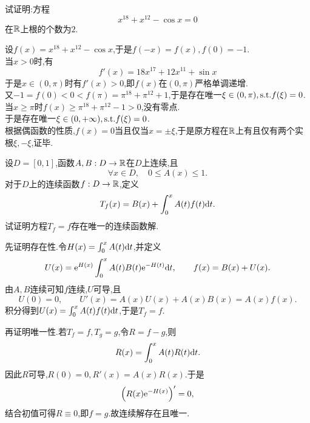 \documentclass{ctexart}
\begin{document}
\begin{problem}[7.(15\songti{分})]
    试证明:方程$$x^{18}+x^{12}-\cos x=0$$在$\mathbb{R}$上根的个数为$2$.
\end{problem}
\begin{solution}
    设$f(x)=x^{18}+x^{12}-\cos x$,于是$f(-x)=f(x),f(0)=-1$.\\
    当$x>0$时,有$$f'(x)=18x^{17}+12x^{11}+\sin x$$
    于是$x\in(0,\pi)$时有$f'(x)>0$,即$f(x)$在$(0,\pi)$严格单调递增.\\
    又$-1=f(0)<0<f(\pi)=\pi^{18}+\pi^{12}+1$,于是存在唯一$\xi\in(0,\pi),\text{s.t.} f(\xi)=0$.\\
    当$x\geqslant\pi$时$f(x)\geqslant \pi^{18}+\pi^{12}-1>0$,没有零点.\\
    于是存在唯一$\xi\in(0,+\infty),\text{s.t.} f(\xi)=0$.\\
    根据偶函数的性质,$f(x)=0$当且仅当$x=\pm\xi$,于是原方程在$\mathbb{R}$上有且仅有两个实根$\xi,-\xi$,证毕.
\end{solution}
\begin{problem}[8.(15\songti{分})]
设$D=[0,1]$,函数$A,B:D\to\mathbb{R}$在$D$上连续,且
    \[\forall x\in D,\quad0\leqslant A(x)\leqslant1.\]
    对于$D$上的连续函数$f:D\to\mathbb{R}$,定义
    \[T_f(x)=B(x)+\int_0^xA(t)f(t)\mathrm{d} t.\]
    试证明方程$T_f=f$存在唯一的连续函数解.
\end{problem}
\begin{solution}
先证明存在性.令$H(x)=\int_0^xA(t)\mathrm{d} t$,并定义
    \[U(x)=\mathrm{e}^{H(x)}\int_0^xA(t)B(t)\mathrm{e}^{-H(t)}\mathrm{d} t,\qquad f(x)=B(x)+U(x).\]
    由$A,B$连续可知$f$连续,$U$可导,且
    \[U(0)=0,\qquad U'(x)=A(x)U(x)+A(x)B(x)=A(x)f(x).\]
    积分得到$U(x)=\int_0^xA(t)f(t)\mathrm{d} t$,于是$T_f=f$.

    再证明唯一性.若$T_f=f,T_g=g$,令$R=f-g$,则
    \[R(x)=\int_0^xA(t)R(t)\mathrm{d} t.\]
    因此$R$可导,$R(0)=0,R'(x)=A(x)R(x)$.于是
    \[\left(R(x)\mathrm{e}^{-H(x)}\right)'=0,\]
    结合初值可得$R\equiv0$,即$f=g$.故连续解存在且唯一.
\end{solution}
\end{document}
